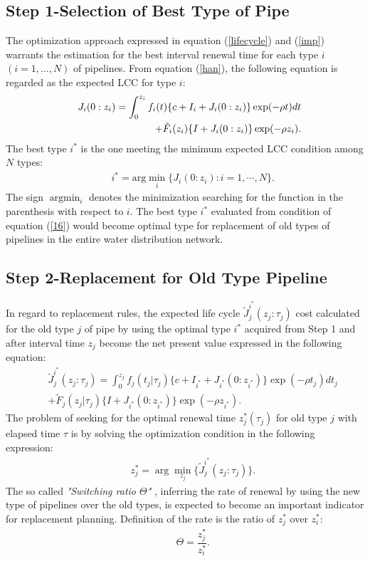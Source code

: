 \subsection{Step 1-Selection of Best Type of Pipe}
\label{571}
The optimization approach expressed in equation (\ref{lifecycle}) and (\ref{imp}) warrants the estimation for the best interval renewal time for each type $i$ $(i=1,...,N)$ of pipelines. From equation (\ref{han}), the following equation is regarded as the expected LCC for type $i$:
\begin{eqnarray}
&& J_i(0:z_i)= \int_0^{z_i} f_i(t)\{c+I_i+J_i(0:z_i)\} \exp(-\rho t)dt  \nonumber \\
&& \hspace{10mm} + \tilde{F}_i(z_i)\{I+J_i(0:z_i)\} \exp(-\rho z_i).  \label{han1}
\end{eqnarray}
The best type $i^*$ is the one meeting the minimum expected LCC condition among $N$ types:
\begin{eqnarray}
&& i^\ast=\mbox{arg} \min_{i}\{J_i(0:z_i):i=1,\cdots,N\}. \label{16}
\end{eqnarray}
The sign $\mbox{arg}\min_{i}$ denotes the minimization searching for the function in the parenthesis with respect to $i$. The best type $i^*$ evaluated from condition of equation (\ref{16}) would become optimal type for replacement of old types of pipelines in the entire water distribution network.
\subsection{Step 2-Replacement for Old Type Pipeline}
\label{572}
In regard to replacement rules, the expected life cycle $\tilde{J}_j^{i^\ast} (z_j:\tau_j)$ cost calculated for the old type $j$ of pipe by using the optimal type $i^*$ acquired from Step 1 and after interval time $z_j$ become the net present value expressed in the following equation:
\begin{eqnarray}
&& \tilde{J}_j^{i^\ast}(z_j:\tau_j)
 =\int_0^{z_j} f_j(t_j|\tau_j)\{c+I_{i^\ast}+J_{i^\ast}(0:z_{i^\ast})\} \exp(-\rho t_j)dt_j  \nonumber \\
&& + \tilde{F}_j(z_j|\tau_j)\{I+J_{i^\ast}(0:z_{i^\ast})\} \exp(-\rho z_{i^\ast}) . \label{han2}
\end{eqnarray}
The problem of seeking for the optimal renewal time $z_j^\ast(\tau_j)$ for old type $j$ with elapsed time $\tau$ is by solving the optimization condition in the following expression:
\begin{eqnarray}
&& z_j^\ast=\arg \min_{z_j} \{\tilde{J}_j^{i^\ast}(z_j:\tau_j)\} .\label{sa}
\end{eqnarray}
The so called \textit{"Switching ratio $\Theta$" }, inferring the rate of renewal by using the new type of pipelines over the old types, is expected to become an important indicator for replacement planning. Definition of the rate is the ratio of $z^*_j$ over $z^*_i$:
\begin{eqnarray}
&& \Theta = \dfrac{z^*_j}{z^*_i} .\label{swratio}
\end{eqnarray}

